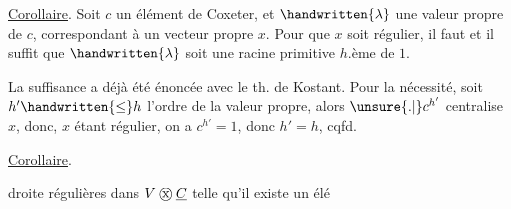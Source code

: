 \uline{Corollaire}. Soit $c$ un élément de Coxeter, et $\handwritten{\lambda}$ une valeur propre de $c$, correspondant à un vecteur propre $x$. Pour que $x$ soit régulier, il faut et il suffit que $\handwritten{\lambda}$ soit une racine primitive $h$.ème de $1$.
\reversemarginpar{}\normalmarginpar

La suffisance a déjà été énoncée avec le th. de Kostant. Pour la nécessité, soit $h'\handwritten{\leq}h$ l'ordre de la valeur propre, alors $\unsure{\mathbin{.}|}c^{h'}$ centralise $x$, donc, $x$ étant régulier, on a $c^{h'}=1$, donc $h'=h$, cqfd.

\uline{Corollaire}.  droite régulières dans $V\mathbin{\text{\textcircled{x}}}\underline{C}$ telle qu'il existe un élé%
